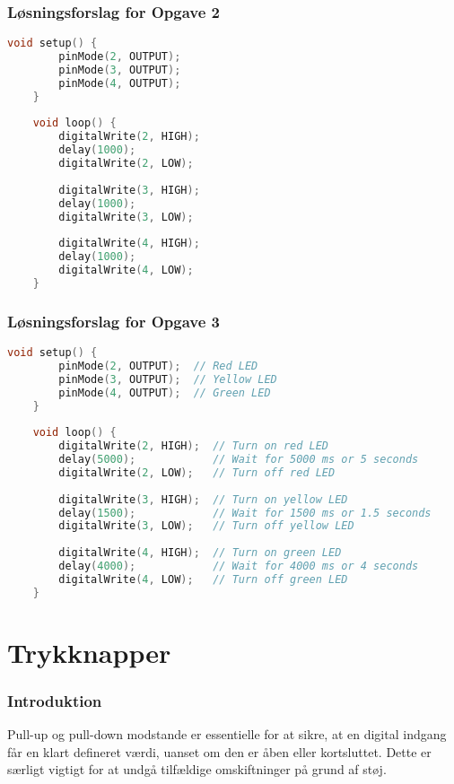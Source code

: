 \subsubsection*{Løsningsforslag for Opgave 2}
\begin{lstlisting}[language=C++]
	void setup() {
		pinMode(2, OUTPUT);
		pinMode(3, OUTPUT);
		pinMode(4, OUTPUT);
	}
	
	void loop() {
		digitalWrite(2, HIGH);  
		delay(1000);                      
		digitalWrite(2, LOW);   
		
		digitalWrite(3, HIGH);  
		delay(1000);                      
		digitalWrite(3, LOW);   
		
		digitalWrite(4, HIGH);  
		delay(1000);                      
		digitalWrite(4, LOW);   
	}
\end{lstlisting}

\subsubsection*{Løsningsforslag for Opgave 3}
\begin{lstlisting}[language=C++]
	void setup() {
		pinMode(2, OUTPUT);  // Red LED
		pinMode(3, OUTPUT);  // Yellow LED
		pinMode(4, OUTPUT);  // Green LED
	}
	
	void loop() {
		digitalWrite(2, HIGH);  // Turn on red LED
		delay(5000);            // Wait for 5000 ms or 5 seconds
		digitalWrite(2, LOW);   // Turn off red LED
		
		digitalWrite(3, HIGH);  // Turn on yellow LED
		delay(1500);            // Wait for 1500 ms or 1.5 seconds
		digitalWrite(3, LOW);   // Turn off yellow LED
		
		digitalWrite(4, HIGH);  // Turn on green LED
		delay(4000);            // Wait for 4000 ms or 4 seconds
		digitalWrite(4, LOW);   // Turn off green LED
	}
\end{lstlisting}

\section{Trykknapper}
\subsubsection*{Introduktion}
Pull-up og pull-down modstande er essentielle for at sikre, at en digital indgang får en klart defineret værdi, uanset om den er åben eller kortsluttet. Dette er særligt vigtigt for at undgå tilfældige omskiftninger på grund af støj.

